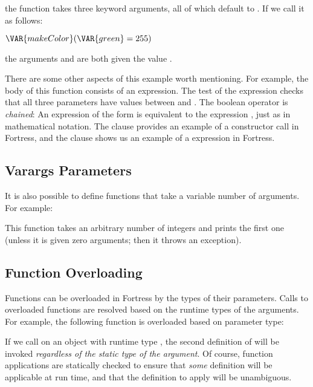 the function  takes three keyword arguments, all of
which default to . If we call it as follows:

\begin{Fortress}
\(\VAR{makeColor}(\VAR{green} = 255)\)
\end{Fortress}

the arguments  and  are both given the value .

There are some other aspects of this example worth mentioning.
For example,
the body of this function consists of an  expression.
The test of the  expression checks that
all three parameters have values between  and . The
boolean operator \EXP{\leq} is \emph{chained}: An expression of
the form  is equivalent to the expression
, just as in mathematical notation.
The  clause provides an example of a constructor call in Fortress,
and the  clause shows us an example
of a  expression in Fortress.

\subsection{Varargs Parameters}
It is also possible to define functions that take a variable number of
arguments.
For example:


This function takes an arbitrary number of integers and prints the first
one (unless it is given zero arguments; then it throws an exception).

\subsection{Function Overloading}
Functions can be overloaded in Fortress
by the types of their parameters. Calls to overloaded functions are
resolved based on the runtime types of the arguments. For example,
the following function is overloaded based on parameter type:




If we call  on an object with runtime type , the
second definition of  will be invoked \emph{regardless of the static type of the argument}.
Of course, function applications are
statically checked to ensure that \emph{some} definition will be
applicable at run time, and that the definition to apply will
be unambiguous.


